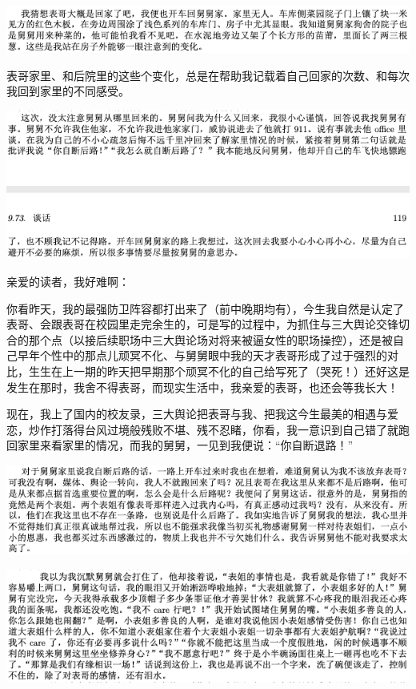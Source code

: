 \documentclass[9pt, b5paper]{article}
\begin{document}
\begin{center}
\includegraphics[width=.9\linewidth]{./pic/p1p118-1.png}
\end{center}

表哥家里、和后院里的这些个变化，总是在帮助我记载着自己回家的次数、和每次我回到家里的不同感受。 

\begin{center}
\includegraphics[width=.9\linewidth]{./pic/p1p119.png}
\end{center}

亲爱的读者，我好难啊：

你看昨天，我的最强防卫阵容都打出来了（前中晚期均有），今生我自然是认定了表哥、会跟表哥在校园里走完余生的，可是写的过程中，为抓住与三大舆论交锋切合的那个点（以接后续职场中三大舆论场对将来被逼女性的职场操控），还是被自己早年个性中的那点儿顽冥不化、与舅舅眼中我的天才表哥形成了过于强烈的对比，生生在上一期的昨天把早期那个顽冥不化的自己给写死了（哭死！）还好这是发生在那时，我舍不得表哥，而现实生活中，我亲爱的表哥，也还会等我长大！

现在，我上了国内的校友录，三大舆论把表哥与我、把我这今生最美的相遇与爱恋，炒作打落得台风过境般残败不堪、残不忍睹，你看，我一意识到自己错了就跑回家里来看家里的情况，而我的舅舅，一见到我便说：“你自断退路！”

\begin{center}
\includegraphics[width=.9\linewidth]{./pic/p1p120-1.png}
\end{center}

\begin{center}
\includegraphics[width=.9\linewidth]{./pic/p1p51-3.png}
\end{center}
\end{document}
